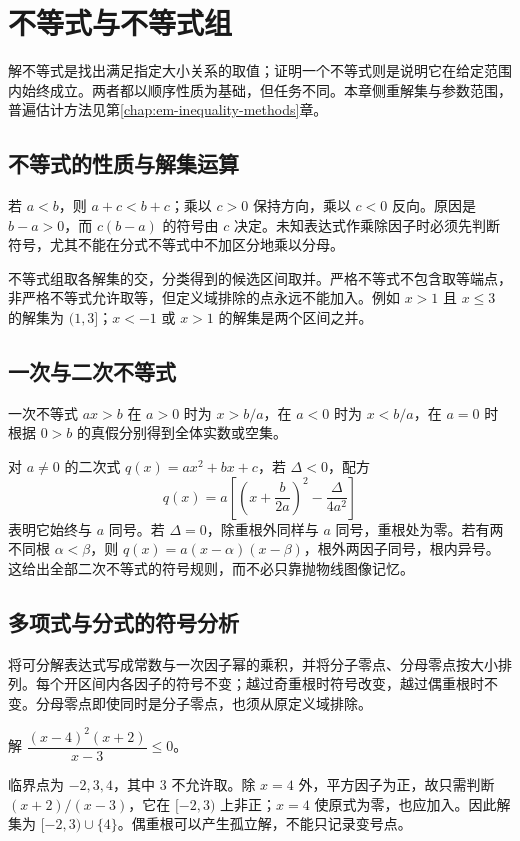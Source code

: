 \setcounter{chapter}{5} %
\chapter{不等式与不等式组}
\label{chap:em-solving-inequalities}
解不等式是找出满足指定大小关系的取值；证明一个不等式则是说明它在给定范围内始终成立。两者都以顺序性质为基础，但任务不同。本章侧重解集与参数范围，普遍估计方法见第\ref{chap:em-inequality-methods}章。

\section{不等式的性质与解集运算}
若 $a<b$，则 $a+c<b+c$；乘以 $c>0$ 保持方向，乘以 $c<0$ 反向。原因是 $b-a>0$，而 $c(b-a)$ 的符号由 $c$ 决定。未知表达式作乘除因子时必须先判断符号，尤其不能在分式不等式中不加区分地乘以分母。

不等式组取各解集的交，分类得到的候选区间取并。严格不等式不包含取等端点，非严格不等式允许取等，但定义域排除的点永远不能加入。例如 $x>1$ 且 $x\le3$ 的解集为 $(1,3]$；$x<-1$ 或 $x>1$ 的解集是两个区间之并。

\section{一次与二次不等式}
一次不等式 $ax>b$ 在 $a>0$ 时为 $x>b/a$，在 $a<0$ 时为 $x<b/a$，在 $a=0$ 时根据 $0>b$ 的真假分别得到全体实数或空集。

对 $a\ne0$ 的二次式 $q(x)=ax^2+bx+c$，若 $\Delta<0$，配方
\[
 q(x)=a\left[\left(x+\frac b{2a}\right)^2-\frac{\Delta}{4a^2}\right]
\]
表明它始终与 $a$ 同号。若 $\Delta=0$，除重根外同样与 $a$ 同号，重根处为零。若有两不同根 $\alpha<\beta$，则 $q(x)=a(x-\alpha)(x-\beta)$，根外两因子同号，根内异号。这给出全部二次不等式的符号规则，而不必只靠抛物线图像记忆。

\section{多项式与分式的符号分析}
将可分解表达式写成常数与一次因子幂的乘积，并将分子零点、分母零点按大小排列。每个开区间内各因子的符号不变；越过奇重根时符号改变，越过偶重根时不变。分母零点即使同时是分子零点，也须从原定义域排除。

\begin{example}
解 $\dfrac{(x-4)^2(x+2)}{x-3}\le0$。
\end{example}
\begin{solve}
临界点为 $-2,3,4$，其中 $3$ 不允许取。除 $x=4$ 外，平方因子为正，故只需判断 $(x+2)/(x-3)$，它在 $[-2,3)$ 上非正；$x=4$ 使原式为零，也应加入。因此解集为 $[-2,3)\cup\{4\}$。偶重根可以产生孤立解，不能只记录变号点。
\end{solve}

